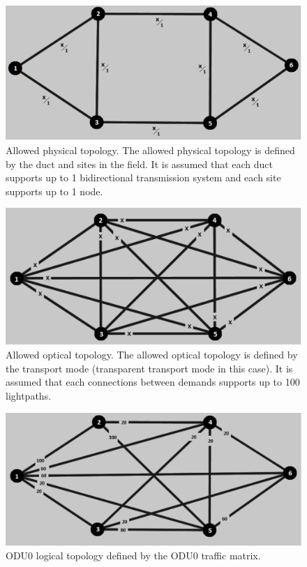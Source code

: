 \begin{figure}[H]
\centering
\includegraphics[width=13cm]{sdf/heuristic/transparent_protection/figures/allowed_physical}
\caption{Allowed physical topology. The allowed physical topology is defined by the duct and sites in the field. It is assumed that each duct supports up to 1 bidirectional transmission system and each site supports up to 1 node.}
\label{allowed_physical_protection_ref_high_heuristic_transparent}
\end{figure}

\begin{figure}[H]
\centering
\includegraphics[width=13cm]{sdf/heuristic/transparent_protection/figures/allowed_optical}
\caption{Allowed optical topology. The allowed optical topology is defined by the transport mode (transparent transport mode in this case). It is assumed that each connections between demands supports up to 100 lightpaths.}
\label{allowed_optical_protection_ref_high_heuristic_transparent}
\end{figure}

\begin{figure}[H]
\centering
\includegraphics[width=13cm]{sdf/heuristic/transparent_protection/figures/logical_topology_odu0_high}
\caption{ODU0 logical topology defined by the ODU0 traffic matrix.}
\label{logical_ODU0_protection_ref_high_heuristic_transparent}
\end{figure}

